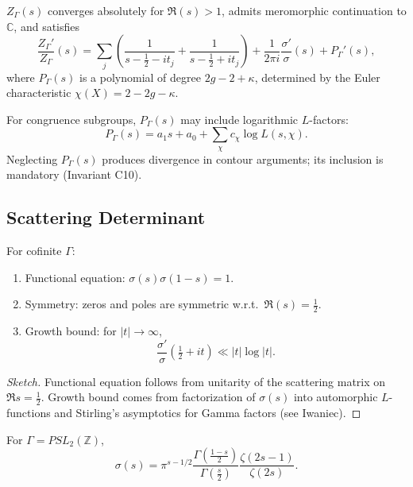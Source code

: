 \begin{theorem}
\label{thm:Zprime}
$Z_\Gamma(s)$ converges absolutely for $\Re(s)>1$, admits meromorphic continuation to $\mathbb{C}$, and satisfies
\[
\frac{Z_\Gamma'}{Z_\Gamma}(s) =
\sum_j \left(\frac{1}{s-\tfrac{1}{2}-it_j}+\frac{1}{s-\tfrac{1}{2}+it_j}\right)
+ \frac{1}{2\pi i}\frac{\sigma'}{\sigma}(s) + P_\Gamma'(s),
\]
where $P_\Gamma(s)$ is a polynomial of degree $2g-2+\kappa$, determined by the Euler characteristic
$\chi(X)=2-2g-\kappa$.
\end{theorem}

\begin{remark}
For congruence subgroups, $P_\Gamma(s)$ may include logarithmic $L$-factors:
\[
P_\Gamma(s) = a_1s + a_0 + \sum_{\chi} c_\chi \log L(s,\chi).
\]
Neglecting $P_\Gamma(s)$ produces divergence in contour arguments; its inclusion is mandatory (Invariant C10).
\end{remark}

\subsection{Scattering Determinant}

\begin{theorem}
\label{thm:sigma}
For cofinite $\Gamma$:
\begin{enumerate}[label=(\roman*)]
  \item Functional equation: $\sigma(s)\sigma(1-s)=1$.
  \item Symmetry: zeros and poles are symmetric w.r.t.\ $\Re(s)=\tfrac12$.
  \item Growth bound: for $|t|\to\infty$,
  \[
  \frac{\sigma'}{\sigma}\!\left(\tfrac12+it\right) \ll |t|\log|t|.
  \]
\end{enumerate}
\end{theorem}

\begin{proof}[Sketch]
Functional equation follows from unitarity of the scattering matrix on $\Re s=\tfrac12$.
Growth bound comes from factorization of $\sigma(s)$ into automorphic $L$-functions and Stirling’s asymptotics for Gamma factors (see Iwaniec).
\end{proof}

\begin{example}
For $\Gamma=PSL_2(\mathbb{Z})$,
\[
\sigma(s)= \pi^{s-1/2}\frac{\Gamma(\tfrac{1-s}{2})}{\Gamma(\tfrac{s}{2})}
\frac{\zeta(2s-1)}{\zeta(2s)}.
\]
\end{example}

